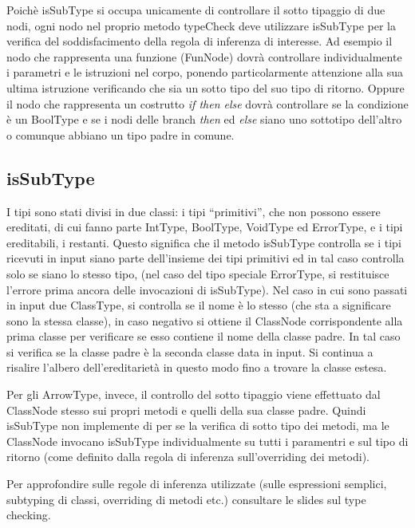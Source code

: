 \documentclass{scrreprt}
\begin{document}
Poichè isSubType si occupa unicamente di controllare il sotto tipaggio di due nodi, ogni nodo nel proprio metodo typeCheck deve utilizzare isSubType per la verifica del soddisfacimento della
regola di inferenza di interesse. Ad esempio il nodo che rappresenta una funzione (FunNode) dovrà controllare individualmente i parametri e le istruzioni nel corpo, ponendo particolarmente attenzione alla sua ultima istruzione verificando che sia un sotto tipo del suo tipo di ritorno. 
Oppure il nodo che rappresenta un costrutto \textit{if then else} dovrà
controllare se la condizione è un BoolType e se i nodi delle branch \textit{then} ed \textit{else} siano uno sottotipo dell'altro o comunque abbiano un tipo padre in comune.

\subsection{isSubType}

I tipi sono stati divisi in due classi: i tipi ``primitivi'', che non possono essere ereditati, di cui fanno parte
IntType, BoolType, VoidType ed ErrorType, e i tipi ereditabili, i restanti. Questo significa che il metodo isSubType 
controlla se i tipi ricevuti in input siano parte dell'insieme dei tipi primitivi ed in tal caso controlla solo se siano lo
stesso tipo, (nel caso del tipo speciale ErrorType, si restituisce l'errore prima ancora delle invocazioni di isSubType).
Nel caso in cui sono passati in input due ClassType, si controlla se il nome è lo stesso (che sta a significare sono la stessa classe), in caso negativo si 
ottiene il ClassNode corrispondente alla prima classe per verificare se esso contiene il nome della classe padre. In tal caso
si verifica se la classe padre è la seconda classe data in input. Si continua a risalire l'albero dell'ereditarietà in questo modo fino a trovare la classe estesa.

Per gli ArrowType, invece, il controllo del sotto tipaggio viene effettuato dal ClassNode stesso sui propri metodi e quelli della sua classe padre. Quindi isSubType
non implemente di per se la verifica di sotto tipo dei metodi, ma le ClassNode invocano isSubType individualmente su tutti i paramentri e sul tipo di ritorno (come definito dalla regola di inferenza sull'overriding dei metodi).

Per approfondire sulle regole di inferenza utilizzate (sulle espressioni semplici, subtyping di classi, overriding di metodi etc.) consultare le slides sul type checking.
\end{document}
